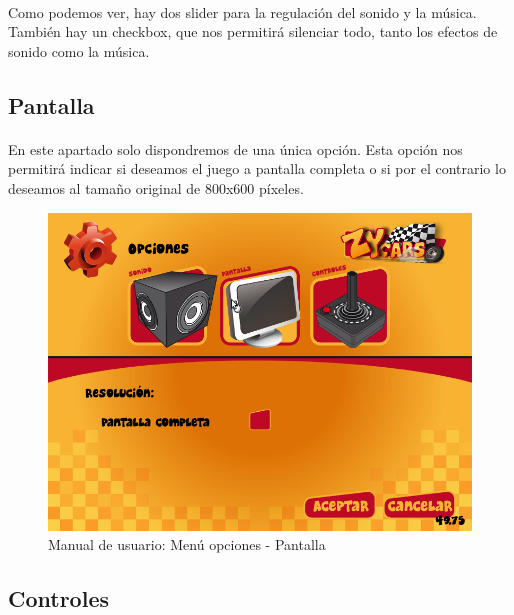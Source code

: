 \paragraph{}
Como podemos ver, hay dos slider para la regulación del sonido y la música. También hay un checkbox, que nos permitirá silenciar todo, tanto 
los efectos de sonido como la música.

\subsection{Pantalla}

\paragraph{}
En este apartado solo dispondremos de una única opción. Esta opción nos
permitirá indicar si deseamos el juego a pantalla 
completa o si por el contrario lo deseamos al tamaño original de 800x600 píxeles.

\begin{figure}[H]
  \label{menu_pantalla}
  \begin{center}
    \includegraphics[scale=0.4]{imagenes/capturas/menuopcionespantalla.png}
  \end{center}
 \caption{Manual de usuario: Menú opciones - Pantalla}
\end{figure}

\subsection{Controles}

